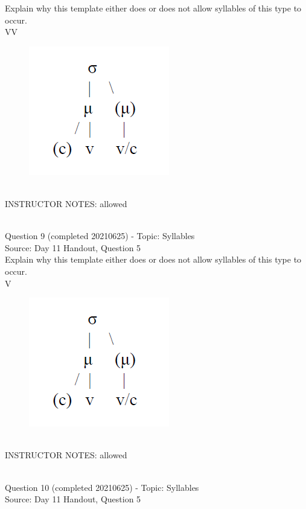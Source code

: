 \documentclass[12pt]{article}
\begin{document}
Explain why this template either does or does not allow syllables of this type to occur.\\

VV

\begin{figure}[H]
\includegraphics{../images/ponapean_syllabletemplate.png}
\end{figure}

~\\
INSTRUCTOR NOTES: allowed


~\\

{\large Question 9} (completed 20210625) - Topic: Syllables\\
Source: Day 11 Handout, Question 5\\

Explain why this template either does or does not allow syllables of this type to occur.\\

V

\begin{figure}[H]
\includegraphics{../images/ponapean_syllabletemplate.png}
\end{figure}

~\\
INSTRUCTOR NOTES: allowed


~\\

{\large Question 10} (completed 20210625) - Topic: Syllables\\
Source: Day 11 Handout, Question 5\\
\end{document}
